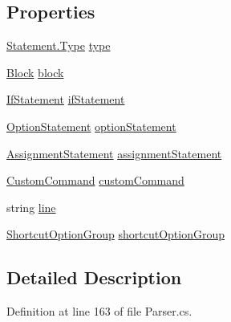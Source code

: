 \subsection*{Properties}
\begin{DoxyCompactItemize}
\item 
\hyperlink{a00160_a518000e4e6219ce5f9f4229f505cd944}{Statement.\-Type} \hyperlink{a00160_aa3fa0eb260e412720562ce06b7dc06fe}{type}
\item 
\hyperlink{a00037}{Block} \hyperlink{a00160_ac14dfc7210974b4cd86402ed011fb0b6}{block}
\item 
\hyperlink{a00112}{If\-Statement} \hyperlink{a00160_a9a71577456598af0f25b23ccd02154e4}{if\-Statement}
\item 
\hyperlink{a00140}{Option\-Statement} \hyperlink{a00160_a15020b7dab4983adbd185d5c2c2ebe84}{option\-Statement}
\item 
\hyperlink{a00033}{Assignment\-Statement} \hyperlink{a00160_a7fa97a80f1b9313bc2bd4194e3f75759}{assignment\-Statement}
\item 
\hyperlink{a00077}{Custom\-Command} \hyperlink{a00160_a8a98e7d4c66f9909da865f0e671d69f2}{custom\-Command}
\item 
string \hyperlink{a00160_a37695c7b00776bb292fd64894a70fb72}{line}
\item 
\hyperlink{a00154}{Shortcut\-Option\-Group} \hyperlink{a00160_a54d73ad69c4af4a0d61edeaea4c8ca4f}{shortcut\-Option\-Group}
\end{DoxyCompactItemize}


\subsection{Detailed Description}


Definition at line 163 of file Parser.\-cs.



